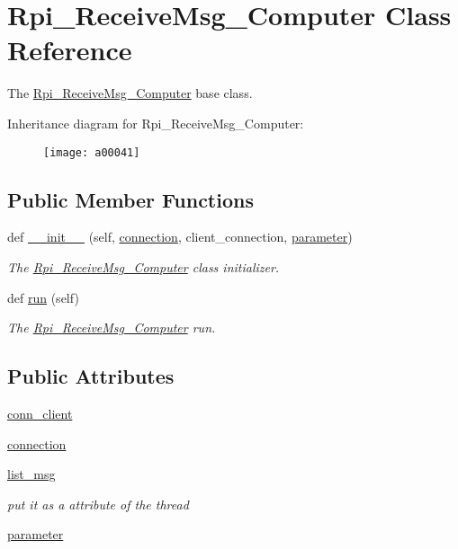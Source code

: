 \hypertarget{a00041}{}\section{Rpi\+\_\+\+Receive\+Msg\+\_\+\+Computer Class Reference}
\label{a00041}


The \hyperlink{a00041}{Rpi\+\_\+\+Receive\+Msg\+\_\+\+Computer} base class.  


Inheritance diagram for Rpi\+\_\+\+Receive\+Msg\+\_\+\+Computer\+:\begin{figure}[H]
\begin{center}
\leavevmode
\texttt{[image: a00041]}
\end{center}
\end{figure}
\subsection*{Public Member Functions}
\begin{DoxyCompactItemize}
\item 
def \hyperlink{a00041_ae168de759b924eaf8c628e5b550bf9d6}{\+\_\+\+\_\+init\+\_\+\+\_\+} (self, \hyperlink{a00041_a10275a078bd1abcbebc206cc5d19e18b}{connection}, client\+\_\+connection, \hyperlink{a00041_a0d71b5c1dcca8d3fee88d6a11d3e2071}{parameter})
\begin{DoxyCompactList}\small\item\em The \hyperlink{a00041}{Rpi\+\_\+\+Receive\+Msg\+\_\+\+Computer} class initializer. \end{DoxyCompactList}\item 
def \hyperlink{a00041_ad22709b2e67308af35f55680d5a026e0}{run} (self)
\begin{DoxyCompactList}\small\item\em The \hyperlink{a00041}{Rpi\+\_\+\+Receive\+Msg\+\_\+\+Computer} run. \end{DoxyCompactList}\end{DoxyCompactItemize}
\subsection*{Public Attributes}
\begin{DoxyCompactItemize}
\item 
\hyperlink{a00041_a72425342c280a92ddf9d5f113cf11b9f}{conn\+\_\+client}
\item 
\hyperlink{a00041_a10275a078bd1abcbebc206cc5d19e18b}{connection}
\item 
\hyperlink{a00041_adf3bb5e317942dfceab6e24a8ccb0c84}{list\+\_\+msg}
\begin{DoxyCompactList}\small\item\em put it as a attribute of the thread \end{DoxyCompactList}\item 
\hyperlink{a00041_a0d71b5c1dcca8d3fee88d6a11d3e2071}{parameter}
\end{DoxyCompactItemize}


